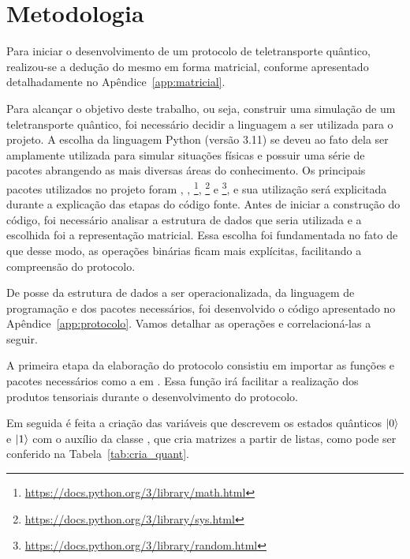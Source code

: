 
\chapter{Metodologia}

Para iniciar o desenvolvimento de um protocolo de teletransporte quântico, realizou-se a dedução do mesmo em forma matricial, conforme apresentado detalhadamente no Apêndice~\ref{app:matricial}.

Para alcançar o objetivo deste trabalho, ou seja, construir uma simulação de um teletransporte quântico, foi necessário decidir a linguagem a ser utilizada para o projeto. A escolha da linguagem Python (versão 3.11) se deveu ao fato dela ser amplamente utilizada para simular situações físicas e possuir uma série de pacotes abrangendo as mais diversas áreas do conhecimento. Os principais pacotes utilizados no projeto foram  \cite{sympy},  \cite{harris2020array}, \footnote{\url{https://docs.python.org/3/library/math.html}}, \footnote{\url{https://docs.python.org/3/library/sys.html}} e \footnote{\url{https://docs.python.org/3/library/random.html}}, e sua utilização será explicitada durante a explicação das etapas do código fonte. Antes de iniciar a construção do código, foi necessário analisar a estrutura de dados que seria utilizada e a escolhida foi a representação matricial. Essa escolha foi fundamentada no fato de que desse modo, as operações binárias ficam mais explícitas, facilitando a compreensão do protocolo.

De posse da estrutura de dados a ser operacionalizada, da linguagem de programação e dos pacotes necessários, foi desenvolvido o código apresentado no Apêndice~\ref{app:protocolo}. Vamos detalhar as operações e correlacioná-las a seguir.

A primeira etapa da elaboração do protocolo consistiu em importar as funções e pacotes necessários como a  em . Essa função irá facilitar a realização dos produtos tensoriais durante o desenvolvimento do protocolo.

Em seguida é feita a criação das variáveis que descrevem os estados quânticos $\ket{0}$ e $\ket{1}$ com o auxílio da classe , que cria matrizes a partir de listas, como pode ser conferido na Tabela~\ref{tab:cria_quant}.

